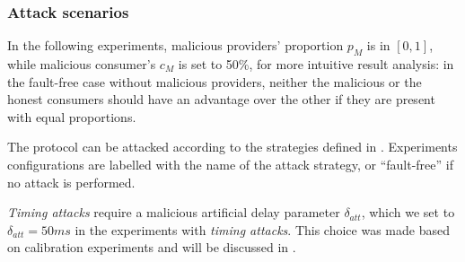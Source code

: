 

\subsubsection{Attack scenarios}

In the following experiments, malicious providers' proportion $p_{M}$ is in $[0,1]$, while malicious consumer's $c_{M}$ is set to 50\%, for more intuitive result analysis: 
in the fault-free case without malicious providers, neither the malicious or the honest consumers should have an advantage over the other if they are present with equal proportions. 

The protocol can be attacked according to the strategies defined in . 
Experiments configurations are labelled with the name of the attack strategy, or ``fault-free'' if no attack is performed.

\textit{Timing attacks} require a malicious artificial delay parameter $\delta_{att}$, which we set to $\delta_{att}=50ms$ in the experiments with \textit{timing attacks}. 
This choice was made based on calibration experiments and will be discussed in .

